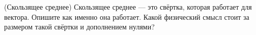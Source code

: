 \begin{problem}{(Скользящее среднее)}
Скользящее среднее --- это свёртка, которая работает для вектора. Опишите как именно она работает. Какой физический смысл стоит за размером такой свёртки и дополнением нулями? 
\end{problem} 




    

    
    
    
    
    



